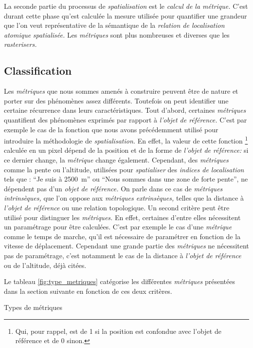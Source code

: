 La seconde partie du processus de \emph{spatialisation} est le
\emph{calcul de la métrique.} C'est durant cette phase qu'est calculée
la mesure utilisée pour quantifier une grandeur que l'on veut
représentative de la sémantique de la \emph{relation de localisation
  atomique} \emph{spatialisée.} Les \emph{métriques} sont plus
nombreuses et diverses que les \emph{rasterisers.}

\subsection{Classification}
Les \emph{métriques} que nous sommes amenés à construire peuvent être
de nature et porter sur des phénomènes assez différents. Toutefois on
peut identifier une certaine récurrence dans leurs
caractéristiques. Tout d'abord, certaines \emph{métriques} quantifient
des phénomènes exprimés par rapport à \emph{l'objet de référence.}
C'est par exemple le cas de la fonction que nous avons précédemment
utilisé pour introduire la méthodologie de \emph{spatialisation.} En
effet, la valeur de cette fonction \footnote{Qui, pour rappel, est de
  1 si la position est confondue avec l'objet de référence et de 0
  sinon.} calculée en un pixel dépend de la position et de la forme de
\emph{l'objet de référence:} si ce dernier change, la \emph{métrique}
change également. Cependant, des \emph{métriques} comme la pente ou
l'altitude, utilisées pour \emph{spatialiser} des \emph{indices de
  localisation} tels que : \enquote{Je suis à \SI{2500}{\meter}} ou
\enquote{Nous sommes dans une zone de forte pente}, ne dépendent pas
d'un \emph{objet de référence.} On parle dans ce cas de
\emph{métriques intrinsèques,} que l'on oppose aux \emph{métriques
  extrinsèques,} telles que la distance à \emph{l'objet de référence}
ou une relation topologique. Un second critère peut être utilisé pour
distinguer les \emph{métriques.}  En effet, certaines d'entre elles
nécessitent un paramétrage pour être calculées. C'est par exemple le
cas d'une \emph{métrique} comme le temps de marche, qu'il est
nécessaire de paramétrer en fonction de la vitesse de
déplacement. Cependant une grande partie des \emph{métriques} ne
nécessitent pas de paramétrage, c'est notamment le cas de la distance
à \emph{l'objet de référence} ou de l'altitude, déjà citées.

Le tableau \ref{fig:type_metriques} catégorise les différentes
\emph{métriques} présentées dans la section suivante en fonction de
ces deux critères.

\begin{table}
  \centering
  
  \caption{Types de métriques}
  \label{fig:type_metriques}
\end{table}


